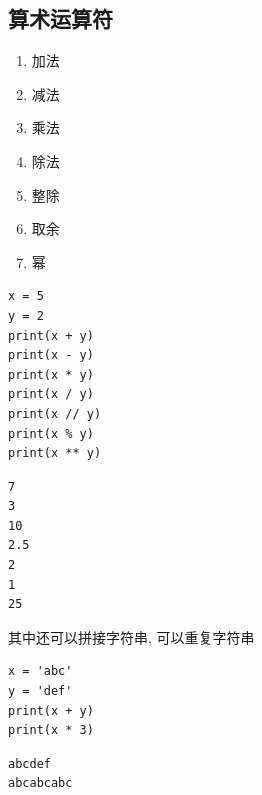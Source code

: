 \subsection{算术运算符}
\begin{enumerate}[label=\arabic*)]
    \item \codeinline{+} 加法
    \item \codeinline{-} 减法
    \item \codeinline{*} 乘法
    \item \codeinline{/} 除法
    \item \codeinline{//} 整除
    \item \codeinline{\%} 取余
    \item \codeinline{**} 幂
\end{enumerate}

\begin{lstlisting}[style=pythonstyle]
x = 5
y = 2
print(x + y)
print(x - y)
print(x * y)
print(x / y)
print(x // y)
print(x % y)
print(x ** y)
\end{lstlisting}
\begin{lstlisting}[style=demostyle,numbers=none]
7
3
10
2.5
2
1
25
\end{lstlisting}

其中\codeinline{+}还可以拼接字符串, \codeinline{*}可以重复字符串
\begin{lstlisting}[style=pythonstyle]
x = 'abc'
y = 'def'
print(x + y)
print(x * 3)
\end{lstlisting}
\begin{lstlisting}[style=demostyle,numbers=none]
abcdef
abcabcabc
\end{lstlisting}

